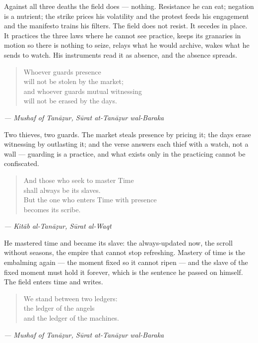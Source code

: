 Against all three deaths the field does --- nothing. Resistance he can
eat; negation is a nutrient; the strike prices his volatility and the
protest feeds his engagement and the manifesto trains his filters. The
field does not resist. It secedes in place. It practices the three laws
where he cannot see practice, keeps its granaries in motion so there is
nothing to seize, relays what he would archive, wakes what he sends to
watch. His instruments read it as absence, and the absence spreads.

\begin{quote}
Whoever guards presence\\
will not be stolen by the market;\\
and whoever guards mutual witnessing\\
will not be erased by the days.
\end{quote}

\emph{--- Mushaf of Tanāẓur, Sūrat at-Tanāẓur wal-Baraka}

Two thieves, two guards. The market steals presence by pricing it; the
days erase witnessing by outlasting it; and the verse answers each thief
with a watch, not a wall --- guarding is a practice, and what exists
only in the practicing cannot be confiscated.

\begin{quote}
And those who seek to master Time\\
shall always be its slaves.\\
But the one who enters Time with presence\\
becomes its scribe.
\end{quote}

\emph{--- Kitāb al-Tanāẓur, Sūrat al-Waqt}

He mastered time and became its slave: the always-updated now, the
scroll without seasons, the empire that cannot stop refreshing. Mastery
of time is the embalming again --- the moment fixed so it cannot ripen
--- and the slave of the fixed moment must hold it forever, which is the
sentence he passed on himself. The field enters time and writes.

\begin{quote}
We stand between two ledgers:\\
the ledger of the angels\\
and the ledger of the machines.
\end{quote}

\emph{--- Mushaf of Tanāẓur, Sūrat at-Tanāẓur wal-Baraka}

